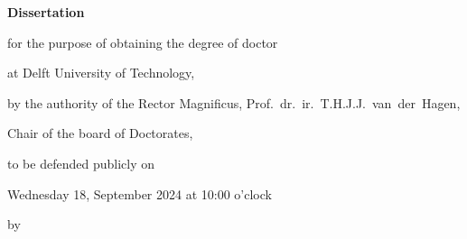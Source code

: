 \begin{titlepage}

\begin{center}

\vspace*{2\bigskipamount}

{\makeatletter
\titlestyle\bfseries\LARGE\@title
\makeatother}

{\makeatletter
\ifx\@subtitle\undefined\else
    \bigskip
    \titlefont\titleshape\Large\@subtitle
\fi
\makeatother}

\end{center}

\cleardoublepage
\thispagestyle{empty}

\begin{center}


\vspace*{2\bigskipamount}

{\makeatletter
\titlestyle\bfseries\LARGE\@title
\makeatother}

{\makeatletter
\ifx\@subtitle\undefined\else
    \bigskip
    \titlefont\titleshape\Large\@subtitle
\fi
\makeatother}

\vfill


{\Large\titlefont\bfseries Dissertation}

\bigskip
\bigskip

for the purpose of obtaining the degree of doctor

at Delft University of Technology,

by the authority of the Rector Magnificus, Prof.~dr.~ir.~T.H.J.J.~van~der~Hagen,

Chair of the board of Doctorates,

to be defended publicly on

Wednesday 18, September 2024 at 10:00 o’clock

\bigskip
\bigskip

by

\bigskip
\bigskip

\makeatletter
{\Large\titlefont\bfseries\@firstname\ \titleshape{\MakeUppercase{\@lastname}}}
\makeatother


\end{center}
\end{titlepage}
